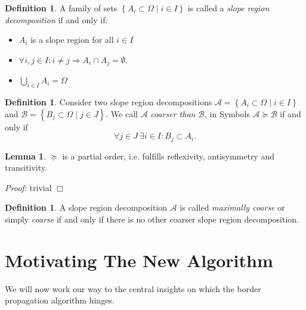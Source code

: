\documentclass[a4paper,12pt]{paper}
\theoremstyle{plain}
\theoremstyle{definition}
\newtheorem{defn}[thm]{Definition} %
\newtheorem{lem}[thm]{Lemma}
\begin{document}
\begin{defn}
A family of sets $\left\{ A_i \subset \Omega \mid i \in I \right\}$ is called a \emph{slope region decomposition} if and only if:
\begin{itemize}
\item $A_i$ is a slope region for all $i \in I$
\item $\forall i,j \in I: i \neq j \Rightarrow A_i \cap A_j = \emptyset$.
\item $\bigcup_{i\in I} A_i = \Omega$
\end{itemize}
\end{defn}



\begin{defn}
Consider two slope region decompositions $\mathcal{A} = \left\{ A_i \subset \Omega \mid i \in I \right\}$ and $\mathcal{B} = \left\{ B_j \subset \Omega \mid j \in J \right\}$. We call $\mathcal{A}$ \emph{coarser than} $\mathcal{B}$, in Symbols $\mathcal{A} \succeq \mathcal{B}$ if and only if
\begin{equation*}
\forall j \in J ~ \exists i \in I: B_j \subset A_i.
\end{equation*}
\end{defn}

\begin{lem}
$\succeq$ is a partial order, i.e. fulfills reflexivity, antisymmetry and transitivity.

\emph{Proof:} trivial \hfill $\Box$
\end{lem}

\begin{defn}
A slope region decomposition $\mathcal{A}$ is called \emph{maximally coarse} or simply \emph{coarse} if and only if there is no other coarser slope region decomposition.
\end{defn}



\section{Motivating The New Algorithm}
We will now work our way to the central insights on which the border propagation algorithm hinges.
\end{document}

